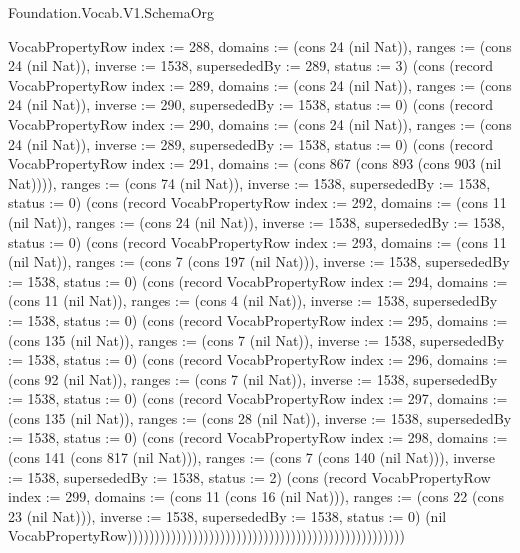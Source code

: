 \begin{lexlean}{Foundation.Vocab.V1.SchemaOrg}
\begin{semanticmodule}
{VocabPropertyRow {index := 288, domains := (cons 24 (nil Nat)), ranges := (cons 24 (nil Nat)), inverse := 1538, supersededBy := 289, status := 3}) (cons (record VocabPropertyRow {index := 289, domains := (cons 24 (nil Nat)), ranges := (cons 24 (nil Nat)), inverse := 290, supersededBy := 1538, status := 0}) (cons (record VocabPropertyRow {index := 290, domains := (cons 24 (nil Nat)), ranges := (cons 24 (nil Nat)), inverse := 289, supersededBy := 1538, status := 0}) (cons (record VocabPropertyRow {index := 291, domains := (cons 867 (cons 893 (cons 903 (nil Nat)))), ranges := (cons 74 (nil Nat)), inverse := 1538, supersededBy := 1538, status := 0}) (cons (record VocabPropertyRow {index := 292, domains := (cons 11 (nil Nat)), ranges := (cons 24 (nil Nat)), inverse := 1538, supersededBy := 1538, status := 0}) (cons (record VocabPropertyRow {index := 293, domains := (cons 11 (nil Nat)), ranges := (cons 7 (cons 197 (nil Nat))), inverse := 1538, supersededBy := 1538, status := 0}) (cons (record VocabPropertyRow {index := 294, domains := (cons 11 (nil Nat)), ranges := (cons 4 (nil Nat)), inverse := 1538, supersededBy := 1538, status := 0}) (cons (record VocabPropertyRow {index := 295, domains := (cons 135 (nil Nat)), ranges := (cons 7 (nil Nat)), inverse := 1538, supersededBy := 1538, status := 0}) (cons (record VocabPropertyRow {index := 296, domains := (cons 92 (nil Nat)), ranges := (cons 7 (nil Nat)), inverse := 1538, supersededBy := 1538, status := 0}) (cons (record VocabPropertyRow {index := 297, domains := (cons 135 (nil Nat)), ranges := (cons 28 (nil Nat)), inverse := 1538, supersededBy := 1538, status := 0}) (cons (record VocabPropertyRow {index := 298, domains := (cons 141 (cons 817 (nil Nat))), ranges := (cons 7 (cons 140 (nil Nat))), inverse := 1538, supersededBy := 1538, status := 2}) (cons (record VocabPropertyRow {index := 299, domains := (cons 11 (cons 16 (nil Nat))), ranges := (cons 22 (cons 23 (nil Nat))), inverse := 1538, supersededBy := 1538, status := 0}) (nil VocabPropertyRow)))))))))))))))))))))))))))))))))))))))))))))))))))
}


\end{semanticmodule}
\end{lexlean}
